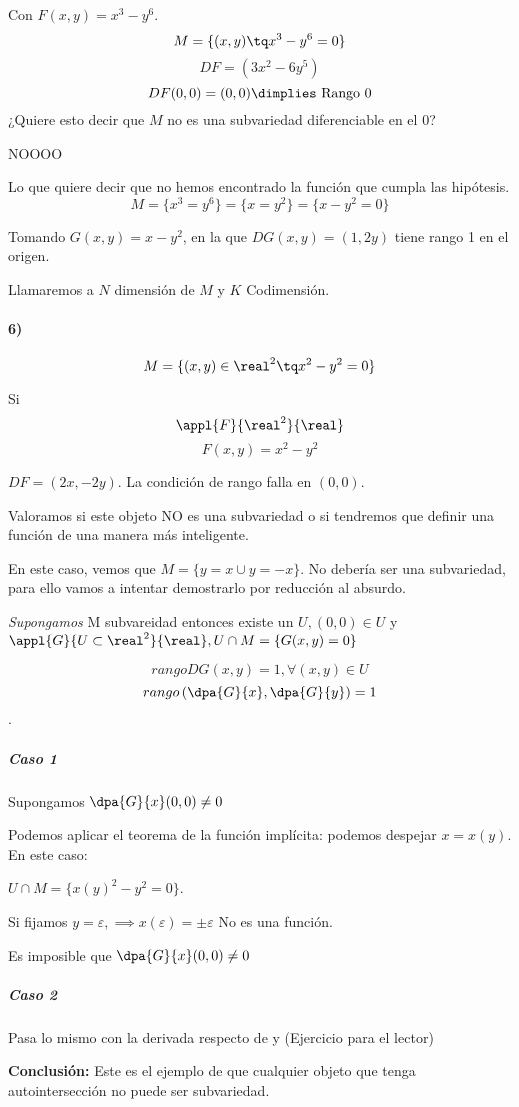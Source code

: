   Con $F(x,y) = x^3 - y^6$.
  \[M = \{(x,y) \tq x^3-y^6 = 0\}\]
  \[DF = (3x^2-6y^5)\]
  \[DF(0,0) = (0,0) \dimplies \text{ Rango 0}\]
  ¿Quiere esto decir que $M$ no es una subvariedad diferenciable en el 0?
  
  NOOOO
  
  Lo que quiere decir que no hemos encontrado la función que cumpla las hipótesis.
  \[M = \{x^3=y^6\} = \{x = y^2\}  = \{x-y^2 = 0\}\]
  
  Tomando $G(x,y) = x-y^2$, en la que $DG(x,y) = (1,2y)$ tiene rango 1 en el origen.
  

  Llamaremos a $N$ dimensión de $M$ y $K$ Codimensión.
 
  \paragraph{6)}
  
  \[M = \{(x,y)\in \real^2 \tq x^2-y^2 = 0\}\]
  
  Si 
	\[\appl{F}{\real^2}{\real}\]
	\[F(x,y) = x^2-y^2\]
  
  $DF = (2x,-2y)$. La condición de rango falla en $(0,0)$.
  
  Valoramos si este objeto NO es una subvariedad o si tendremos que definir una función de una manera más inteligente.
  
  En este caso, vemos que $M = \{ y=x \cup y = -x \}$. No debería ser una subvariedad, para ello vamos a intentar demostrarlo por reducción al absurdo.
  
  \emph{Supongamos} M subvareidad entonces existe un $U, (0,0) \in U$ y $\appl{G}{U\subset\real^2}{\real}, U\cap M = \{G(x,y) = 0\}$
  
\[rango DG(x,y) = 1, \forall(x,y) \in U\]
\[rango\left(\dpa{G}{x},\dpa{G}{y}\right) = 1\].

\subparagraph{Caso 1} Supongamos $\dpa{G}{x}(0,0) \neq 0$

Podemos aplicar el teorema de la función implícita: podemos despejar $x = x(y)$. En este caso:

$U \cap M = \{x(y)^2-y^2 = 0\}$.

Si fijamos $y=\varepsilon, \implies x(\varepsilon) = \pm \varepsilon$ No es una función. 

Es imposible que $\dpa{G}{x}(0,0) \neq 0$

\subparagraph{Caso 2} Pasa lo mismo con la derivada respecto de y (Ejercicio para el lector)


\textbf{Conclusión: } Este es el ejemplo de que cualquier objeto que tenga autointersección no puede ser subvariedad.


